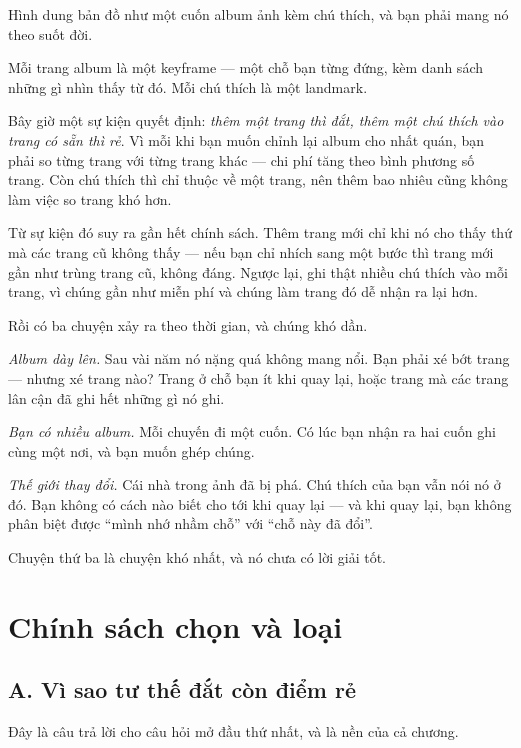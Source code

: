 \documentclass[../../vslam.tex]{subfiles}
\begin{document}
\begin{trucgiac}
Hình dung bản đồ như một cuốn album ảnh kèm chú thích, và bạn phải mang nó theo suốt đời.

Mỗi trang album là một keyframe --- một chỗ bạn từng đứng, kèm danh sách những gì nhìn thấy từ đó. Mỗi chú thích là một landmark.

Bây giờ một sự kiện quyết định: \emph{thêm một trang thì đắt, thêm một chú thích vào trang có sẵn thì rẻ}. Vì mỗi khi bạn muốn chỉnh lại album cho nhất quán, bạn phải so từng trang với từng trang khác --- chi phí tăng theo bình phương số trang. Còn chú thích thì chỉ thuộc về một trang, nên thêm bao nhiêu cũng không làm việc so trang khó hơn.

Từ sự kiện đó suy ra gần hết chính sách. Thêm trang mới chỉ khi nó cho thấy thứ mà các trang cũ không thấy --- nếu bạn chỉ nhích sang một bước thì trang mới gần như trùng trang cũ, không đáng. Ngược lại, ghi thật nhiều chú thích vào mỗi trang, vì chúng gần như miễn phí và chúng làm trang đó dễ nhận ra lại hơn.

Rồi có ba chuyện xảy ra theo thời gian, và chúng khó dần.

\emph{Album dày lên.} Sau vài năm nó nặng quá không mang nổi. Bạn phải xé bớt trang --- nhưng xé trang nào? Trang ở chỗ bạn ít khi quay lại, hoặc trang mà các trang lân cận đã ghi hết những gì nó ghi.

\emph{Bạn có nhiều album.} Mỗi chuyến đi một cuốn. Có lúc bạn nhận ra hai cuốn ghi cùng một nơi, và bạn muốn ghép chúng.

\emph{Thế giới thay đổi.} Cái nhà trong ảnh đã bị phá. Chú thích của bạn vẫn nói nó ở đó. Bạn không có cách nào biết cho tới khi quay lại --- và khi quay lại, bạn không phân biệt được ``mình nhớ nhầm chỗ'' với ``chỗ này đã đổi''.

Chuyện thứ ba là chuyện khó nhất, và nó chưa có lời giải tốt.
\end{trucgiac}

\section{Chính sách chọn và loại}

\subsection{A. Vì sao tư thế đắt còn điểm rẻ}

Đây là câu trả lời cho câu hỏi mở đầu thứ nhất, và là nền của cả chương.
\end{document}
